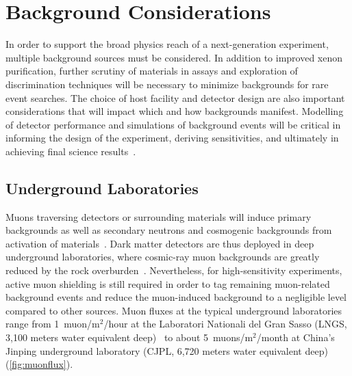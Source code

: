 \section{Background Considerations}\label{sec:backgrounds} 

In order to support the broad physics reach of a next-generation experiment, multiple background sources must be considered. In addition to improved xenon purification, further scrutiny of materials in assays and exploration of discrimination techniques will be necessary to minimize backgrounds for rare event searches. The choice of host facility and detector design are also important considerations that will impact which and how backgrounds manifest. Modelling of detector performance and simulations of background events will be critical in informing the design of the experiment, deriving sensitivities, and ultimately in achieving final science results~\cite{Undagoitia:2015gya}.

\subsection{Underground Laboratories}

Muons traversing detectors or surrounding materials will induce primary backgrounds as well as secondary neutrons and cosmogenic backgrounds from activation of materials~\cite{Mei:2005gm,Kudryavtsev:2008fi}. Dark matter detectors are thus deployed in deep underground laboratories, where cosmic-ray muon backgrounds are greatly reduced by the rock overburden~\cite{Bettini:2014tva}. Nevertheless, for high-sensitivity experiments, active muon shielding is still required in order to tag remaining muon-related background events and reduce the muon-induced background to a negligible level compared to other sources. Muon fluxes at the typical underground laboratories range from 1~muon/m$^2$/hour at the Laboratori Nationali del Gran Sasso  (LNGS, 3,100 meters water equivalent deep)~\cite{Mei:2005gm,Votano:2012fr} to about 5~muons/m$^2$/month at China's Jinping underground laboratory (CJPL, 6,720 meters water equivalent deep)~\cite{Yu-Cheng:2013iaa, Cheng:2018lcf} (\autoref{fig:muonflux}).

